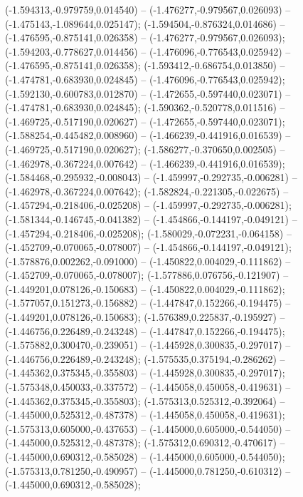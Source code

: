  (-1.594313,-0.979759,0.014540) -- (-1.476277,-0.979567,0.026093) -- (-1.475143,-1.089644,0.025147);
 (-1.594504,-0.876324,0.014686) -- (-1.476595,-0.875141,0.026358) -- (-1.476277,-0.979567,0.026093);
 (-1.594203,-0.778627,0.014456) -- (-1.476096,-0.776543,0.025942) -- (-1.476595,-0.875141,0.026358);
 (-1.593412,-0.686754,0.013850) -- (-1.474781,-0.683930,0.024845) -- (-1.476096,-0.776543,0.025942);
 (-1.592130,-0.600783,0.012870) -- (-1.472655,-0.597440,0.023071) -- (-1.474781,-0.683930,0.024845);
 (-1.590362,-0.520778,0.011516) -- (-1.469725,-0.517190,0.020627) -- (-1.472655,-0.597440,0.023071);
 (-1.588254,-0.445482,0.008960) -- (-1.466239,-0.441916,0.016539) -- (-1.469725,-0.517190,0.020627);
 (-1.586277,-0.370650,0.002505) -- (-1.462978,-0.367224,0.007642) -- (-1.466239,-0.441916,0.016539);
 (-1.584468,-0.295932,-0.008043) -- (-1.459997,-0.292735,-0.006281) -- (-1.462978,-0.367224,0.007642);
 (-1.582824,-0.221305,-0.022675) -- (-1.457294,-0.218406,-0.025208) -- (-1.459997,-0.292735,-0.006281);
 (-1.581344,-0.146745,-0.041382) -- (-1.454866,-0.144197,-0.049121) -- (-1.457294,-0.218406,-0.025208);
 (-1.580029,-0.072231,-0.064158) -- (-1.452709,-0.070065,-0.078007) -- (-1.454866,-0.144197,-0.049121);
 (-1.578876,0.002262,-0.091000) -- (-1.450822,0.004029,-0.111862) -- (-1.452709,-0.070065,-0.078007);
 (-1.577886,0.076756,-0.121907) -- (-1.449201,0.078126,-0.150683) -- (-1.450822,0.004029,-0.111862);
 (-1.577057,0.151273,-0.156882) -- (-1.447847,0.152266,-0.194475) -- (-1.449201,0.078126,-0.150683);
 (-1.576389,0.225837,-0.195927) -- (-1.446756,0.226489,-0.243248) -- (-1.447847,0.152266,-0.194475);
 (-1.575882,0.300470,-0.239051) -- (-1.445928,0.300835,-0.297017) -- (-1.446756,0.226489,-0.243248);
 (-1.575535,0.375194,-0.286262) -- (-1.445362,0.375345,-0.355803) -- (-1.445928,0.300835,-0.297017);
 (-1.575348,0.450033,-0.337572) -- (-1.445058,0.450058,-0.419631) -- (-1.445362,0.375345,-0.355803);
 (-1.575313,0.525312,-0.392064) -- (-1.445000,0.525312,-0.487378) -- (-1.445058,0.450058,-0.419631);
 (-1.575313,0.605000,-0.437653) -- (-1.445000,0.605000,-0.544050) -- (-1.445000,0.525312,-0.487378);
 (-1.575312,0.690312,-0.470617) -- (-1.445000,0.690312,-0.585028) -- (-1.445000,0.605000,-0.544050);
 (-1.575313,0.781250,-0.490957) -- (-1.445000,0.781250,-0.610312) -- (-1.445000,0.690312,-0.585028);
